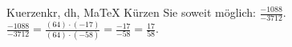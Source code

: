 \begin{MAufgabe}{Kuerzen}{kr, dh, MaTeX}
K\"urzen Sie soweit m\"oglich: $\frac{-1088}{-3712}$.\\ 
\ifLsg\MLoesung
\quad $\frac{-1088}{-3712}=\frac{(64)\cdot(-17)}{(64)\cdot(-58)}=\frac{-17}{-58}=\frac{17}{58}$.\else\relax\fi
 \end{MAufgabe}